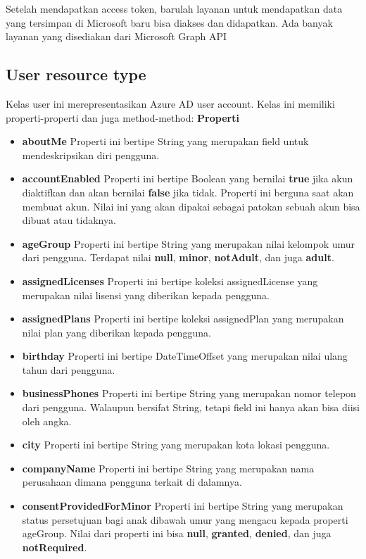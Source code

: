 Setelah mendapatkan access token, barulah layanan untuk mendapatkan data yang tersimpan di Microsoft baru bisa diakses dan didapatkan. Ada banyak layanan yang disediakan dari Microsoft Graph API 

\subsection{User resource type}
Kelas user ini merepresentasikan Azure AD user account. Kelas ini memiliki properti-properti dan juga method-method:
\textbf{Properti}
\begin{itemize}
	\item \textbf{aboutMe}
	Properti ini bertipe String yang merupakan field untuk mendeskripsikan diri pengguna. 
	\item \textbf{accountEnabled}
	Properti ini bertipe Boolean yang bernilai \textbf{true} jika akun diaktifkan dan akan bernilai \textbf{false} jika tidak. Properti ini berguna saat akan membuat akun. Nilai ini yang akan dipakai sebagai patokan sebuah akun bisa dibuat atau tidaknya. 
	\item \textbf{ageGroup}
	Properti ini bertipe String yang merupakan nilai kelompok umur dari pengguna. Terdapat nilai \textbf{null}, \textbf{minor}, \textbf{notAdult}, dan juga \textbf{adult}.
	\item \textbf{assignedLicenses}
	Properti ini bertipe koleksi assignedLicense yang merupakan nilai lisensi yang diberikan kepada pengguna.
	\item \textbf{assignedPlans}
	Properti ini bertipe koleksi assignedPlan yang merupakan nilai plan yang diberikan kepada pengguna.
	\item \textbf{birthday}
	Properti ini bertipe DateTimeOffset yang merupakan nilai ulang tahun dari pengguna. 
	\item \textbf{businessPhones}
	Properti ini bertipe String yang merupakan nomor telepon dari pengguna. Walaupun bersifat String, tetapi field ini hanya akan bisa diisi oleh angka.
	\item \textbf{city}
	Properti ini bertipe String yang merupakan kota lokasi pengguna.
	\item \textbf{companyName}
	Properti ini bertipe String yang merupakan nama perusahaan dimana pengguna terkait di dalamnya.
	\item \textbf{consentProvidedForMinor}
	Properti ini bertipe String yang merupakan status persetujuan bagi anak dibawah umur yang mengacu kepada properti ageGroup. Nilai dari properti ini bisa \textbf{null}, \textbf{granted}, \textbf{denied}, dan juga \textbf{notRequired}. 

\end{itemize}
